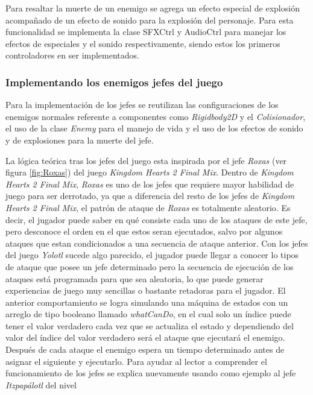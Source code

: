Para resaltar la muerte de un enemigo se agrega un efecto especial de explosión 
acompañado de un efecto de sonido para la explosión del personaje. Para esta 
funcionalidad se implementa la clase SFXCtrl y AudioCtrl para manejar los efectos 
de especiales y el sonido respectivamente, siendo estos los primeros controladores 
en ser implementados.

\subsubsection{Implementando los enemigos jefes del juego}
Para la implementación de los jefes se reutilizan las configuraciones de los enemigos 
normales referente a componentes como \textit{Rigidbody2D} y el \textit{Colisionador}, 
el uso de la clase \textit{Enemy} para el manejo de vida y el uso de los efectos 
de sonido y de explosiones para la muerte del jefe.
\\
\par
La lógica teórica tras los jefes del juego esta inspirada por el jefe 
\textit{Roxas} (ver figura \ref{fig:Roxas}) del juego \textit{Kingdom Hearts 2 
Final Mix}. Dentro de \textit{Kingdom Hearts 2 Final Mix}, \textit{Roxas} es uno 
de los jefes que requiere mayor habilidad de juego para ser derrotado, ya que a 
diferencia del resto de los jefes de \textit{Kingdom Hearts 2 Final Mix}, el 
patrón de ataque de \textit{Roxas} es totalmente aleatorio. Es decir, el jugador 
puede saber en qué consiste cada uno de los ataques de este jefe, pero desconoce 
el orden en el que estos seran ejecutados, salvo por algunos ataques que estan 
condicionados a una secuencia de ataque anterior.  Con los jefes del juego 
\textit{Yolotl} sucede algo parecido, el jugador puede llegar a conocer lo tipos 
de ataque que posee un jefe determinado pero la secuencia de ejecución de los 
ataques está programada para que sea aleatoria, lo que puede generar experiencias 
de juego muy sencillas o bastante retadoras para el jugador. El anterior 
comportamiento se logra simulando una máquina de estados con un arreglo de tipo 
booleano llamado \textit{whatCanDo}, en el cual solo un índice puede tener el 
valor verdadero cada vez que se actualiza el estado y dependiendo del valor del 
índice del valor verdadero será el ataque que ejecutará el enemigo. Después de 
cada ataque el enemigo espera un tiempo determinado antes de asignar el siguiente 
y ejecutarlo. Para ayudar al lector a comprender el funcionamiento de los jefes se 
explica nuevamente usando como ejemplo al jefe \textit{Itzpapálotl} del nivel 
